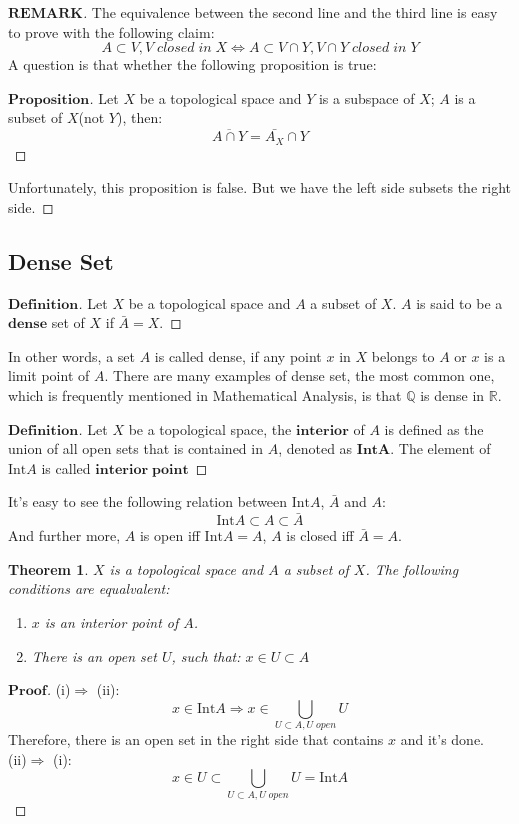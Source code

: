 \documentclass[a4paper, 11pt]{article}
\newtheorem{theorem}{Theorem}
\theoremstyle{remark}
\newenvironment{myremark}
{\renewcommand\qedsymbol{$ $}\begin{proof}[$\mathbf{REMARK}$]}
  {\end{proof}}
\newenvironment{myprf}
{\renewcommand\qedsymbol{$ $}\begin{proof}[$\mathbf{Proof}$]}
  {\end{proof}}
\newenvironment{mydef}
{\renewcommand\qedsymbol{$ $}\begin{proof}[$\mathbf{Definition}$]}
  {\end{proof}}
\newenvironment{myprop}
{\renewcommand\qedsymbol{$ $}\begin{proof}[$\mathbf{Proposition}$]}
  {\end{proof}}
\theoremstyle{definition}
\begin{document}
\begin{myremark}
\noindent
The equivalence between the second line and the third line is easy to prove with
the following claim:
$$
A\subset V,V\;closed\;in\;X\Leftrightarrow A\subset V\cap Y,V\cap Y\;closed\;in\;Y
$$
        A question is that whether the following proposition is true:
        \begin{myprop}
               Let $X$ be a topological space and $Y$ is a subspace of $X$;
               $A$ is a subset of $X$(not $Y$), then:
               $$
               \overline{A\cap Y}=\bar{A_X}\cap Y
               $$
        \end{myprop}
        \noindent
        Unfortunately, this proposition is false. But we have the left side
        subsets the right side.
\end{myremark}
\subsection{Dense Set}
\begin{mydef}
    Let $X$ be a topological space and $A$ a subset of $X$. $A$ is said to be 
    a $\bm{dense}$ set of $X$ if $\bar{A}=X$. 
\end{mydef}
In other words, a set $A$ is called dense, if any point $x$ in $X$ belongs to $A$ or $x$ is a limit point of $A$. There are many examples of dense set, the most
common one,  which is frequently mentioned in Mathematical Analysis, is that
$\mathbb{Q}$ is dense in $\mathbb{R}$. 
\begin{mydef}
        Let $X$ be a topological space, the $\bm{interior}$ of $A$ is defined as
        the union of all open sets that is contained in $A$, denoted as 
        $\mathbf{IntA}$. The element of $\mathrm{Int}A$ is called 
        $\bm{interior\; point}$
\end{mydef}
\noindent
It's easy to see the following relation between $\mathrm{Int}A$, $\bar{A}$ and
$A$:
$$
\mathrm{Int}A\subset A\subset \bar{A}
$$ 
\noindent
And further more, $A$ is open iff $\mathrm{Int}A=A$, $A$ is closed iff 
$\bar{A}=A$.
\begin{theorem}
        $X$ is a topological space and $A$ a subset of $X$.
        The following conditions are equalvalent:
        \begin{enumerate}[label=(\roman*)]
                \item   $x$ is an interior point of $A$.
                \item   There is an open set $U$, such that: $x\in U\subset A$
        \end{enumerate}
\end{theorem}
\begin{myprf}
        (i)$\Rightarrow$ (ii): \\
        $$x\in \mathrm{Int}A\Rightarrow x\in \displaystyle
        \bigcup_{U\subset A,U\;open}U$$
        Therefore, there is an open set in the right side that contains
        $x$ and it's done.\\
        (ii)$\Rightarrow$ (i):\\
        $$x\in U\subset \bigcup_{U\subset A,U\;open}U=\mathrm{Int}A$$
\end{myprf}
\end{document}
